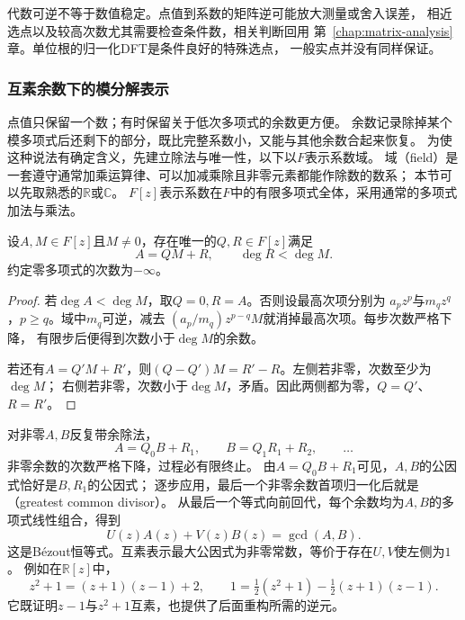 代数可逆不等于数值稳定。点值到系数的矩阵逆可能放大测量或舍入误差，
相近选点以及较高次数尤其需要检查条件数，相关判断回用
第~\ref{chap:matrix-analysis}章。单位根的归一化DFT是条件良好的特殊选点，
一般实点并没有同样保证。

\subsubsection{互素余数下的模分解表示}

点值只保留一个数；有时保留关于低次多项式的余数更方便。
余数记录除掉某个模多项式后还剩下的部分，既比完整系数小，又能与其他余数合起来恢复。
为使这种说法有确定含义，先建立除法与唯一性，以下以$F$表示系数域。
域（field）是一套遵守通常加乘运算律、可以加减乘除且非零元素都能作除数的数系；
本节可以先取熟悉的$\mathbb R$或$\mathbb C$。
$F[z]$表示系数在$F$中的有限多项式全体，采用通常的多项式加法与乘法。
\begin{theorem}[多项式带余除法]
  \label{thm:signal-analysis-polynomial-division}
  设$A,M\in F[z]$且$M\neq0$，存在唯一的$Q,R\in F[z]$满足
  \[
    A=QM+R,\qquad\deg R<\deg M.
  \]
  约定零多项式的次数为$-\infty$。
\end{theorem}
\begin{proof}
  若$\deg A<\deg M$，取$Q=0,R=A$。否则设最高次项分别为
  $a_pz^p$与$m_qz^q$，$p\geq q$。域中$m_q$可逆，减去
  $(a_p/m_q)z^{p-q}M$就消掉最高次项。每步次数严格下降，
  有限步后便得到次数小于$\deg M$的余数。

  若还有$A=Q'M+R'$，则$(Q-Q')M=R'-R$。左侧若非零，次数至少为$\deg M$；
  右侧若非零，次数小于$\deg M$，矛盾。因此两侧都为零，$Q=Q'$、$R=R'$。
\end{proof}

对非零$A,B$反复带余除法，
\[
  A=Q_0B+R_1,\qquad B=Q_1R_1+R_2,\qquad\ldots
\]
非零余数的次数严格下降，过程必有限终止。
由$A=Q_0B+R_1$可见，$A,B$的公因式恰好是$B,R_1$的公因式；
逐步应用，最后一个非零余数首项归一化后就是
（greatest common divisor）。
从最后一个等式向前回代，每个余数均为$A,B$的多项式线性组合，得到
\begin{equation}
  U(z)A(z)+V(z)B(z)=\gcd(A,B).
  \label{eq:signal-analysis-polynomial-bezout}
\end{equation}
这是Bézout恒等式。互素表示最大公因式为非零常数，等价于存在$U,V$使左侧为$1$。
例如在$\mathbb R[z]$中，
\[
  z^2+1=(z+1)(z-1)+2,\qquad
  1=\tfrac12(z^2+1)-\tfrac12(z+1)(z-1).
\]
它既证明$z-1$与$z^2+1$互素，也提供了后面重构所需的逆元。

